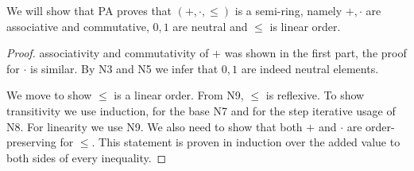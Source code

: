 \subquestion{}
We will show that PA proves that $(+, \cdot, \le)$ is a semi-ring, namely $+, \cdot$ are associative and commutative, $0, 1$ are neutral and $\le$ is linear order.
\begin{proof}
	associativity and commutativity of $+$ was shown in the first part, the proof for $\cdot$ is similar.
	By N3 and N5 we infer that $0, 1$ are indeed neutral elements.
	
	We move to show $\le$ is a linear order.
	From N9, $\le$ is reflexive.
	To show transitivity we use induction, for the base N7 and for the step iterative usage of N8.
	For linearity we use N9.
	We also need to show that both $+$ and $\cdot$ are order-preserving for $\le$.
	This statement is proven in induction over the added value to both sides of every inequality.
\end{proof}


